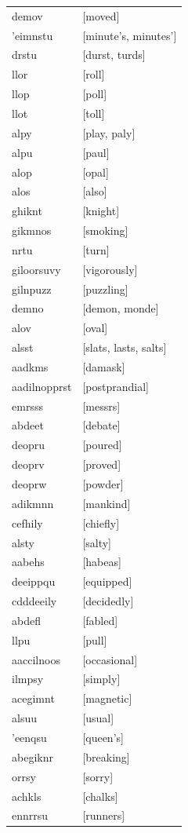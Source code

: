\documentclass{article}
\begin{document}
\begin{tabular}{ll}
demov & [moved] \\
'eimnstu & [minute's, minutes'] \\
drstu & [durst, turds] \\
llor & [roll] \\
llop & [poll] \\
llot & [toll] \\
alpy & [play, paly] \\
alpu & [paul] \\
alop & [opal] \\
alos & [also] \\
ghiknt & [knight] \\
gikmnos & [smoking] \\
nrtu & [turn] \\
giloorsuvy & [vigorously] \\
gilnpuzz & [puzzling] \\
demno & [demon, monde] \\
alov & [oval] \\
alsst & [slats, lasts, salts] \\
aadkms & [damask] \\
aadilnopprst & [postprandial] \\
emrsss & [messrs] \\
abdeet & [debate] \\
deopru & [poured] \\
deoprv & [proved] \\
deoprw & [powder] \\
adikmnn & [mankind] \\
cefhily & [chiefly] \\
alsty & [salty] \\
aabehs & [habeas] \\
deeippqu & [equipped] \\
cdddeeily & [decidedly] \\
abdefl & [fabled] \\
llpu & [pull] \\
aaccilnoos & [occasional] \\
ilmpsy & [simply] \\
acegimnt & [magnetic] \\
alsuu & [usual] \\
'eenqsu & [queen's] \\
abegiknr & [breaking] \\
orrsy & [sorry] \\
achkls & [chalks] \\
ennrrsu & [runners] \\

\end{tabular}
\end{document}
